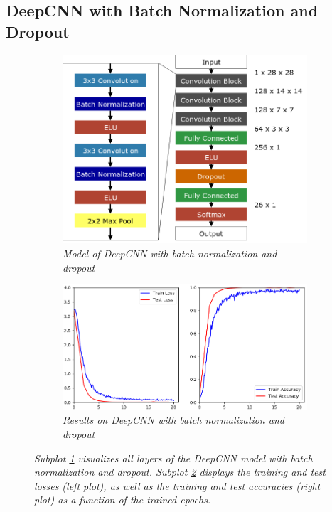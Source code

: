 \documentclass[a4paper]{article}
\begin{document}
\subsection{DeepCNN with Batch Normalization and Dropout}\label{sec:deepCNN_regularized}
\begin{figure}
    \centering
    \hspace{-1cm}
    \begin{subfigure}[b]{0.4\textwidth}
        \includegraphics[height=0.25\paperwidth]{graphics/nets/CNN13_with_BN}
        \caption{\textit{Model of DeepCNN with batch normalization and dropout}}
        \label{fig:deepCNN_regularized_model}
    \end{subfigure}
    \begin{subfigure}[b]{0.5\textwidth}
        \includegraphics[height=0.25\paperwidth]{graphics/nets/CNN13_with_BN_Results}
        \caption{\textit{Results on DeepCNN with batch normalization and dropout}}
        \label{fig:deepCNN_regularized_results}
    \end{subfigure}
    \caption{\textit{Subplot \ref{fig:deepCNN_regularized_model} visualizes all layers of the DeepCNN model with batch normalization and dropout. Subplot \ref{fig:deepCNN_regularized_results} displays the training and test losses (left plot), as well as the training and test accuracies (right plot) as a function of the trained epochs.}}\label{fig:deepCNN_regularized}
\end{figure}
\end{document}
